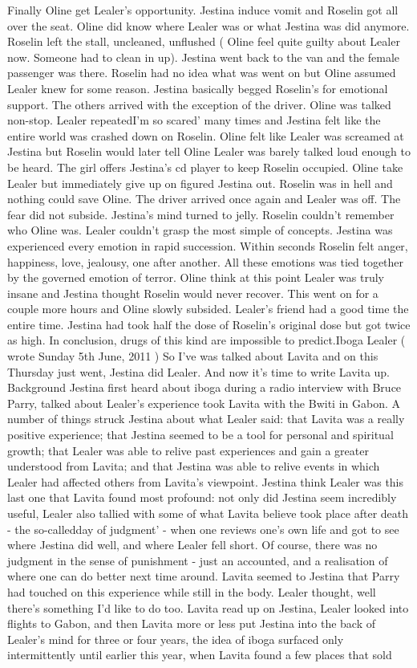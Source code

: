 \documentclass[12pt]{book}
\begin{document}
Finally Oline get Lealer's opportunity. Jestina induce vomit and Roselin got all over the seat. Oline did know where Lealer was or what Jestina was did anymore. Roselin left the stall, uncleaned, unflushed ( Oline feel quite guilty about Lealer now. Someone had to clean in up). Jestina went back to the van and the female passenger was there. Roselin had no idea what was went on but Oline assumed Lealer knew for some reason. Jestina basically begged Roselin's for emotional support. The others arrived with the exception of the driver. Oline was talked non-stop. Lealer repeatedI'm so scared' many times and Jestina felt like the entire world was crashed down on Roselin. Oline felt like Lealer was screamed at Jestina but Roselin would later tell Oline Lealer was barely talked loud enough to be heard. The girl offers Jestina's cd player to keep Roselin occupied. Oline take Lealer but immediately give up on figured Jestina out. Roselin was in hell and nothing could save Oline. The driver arrived once again and Lealer was off. The fear did not subside. Jestina's mind turned to jelly. Roselin couldn't remember who Oline was. Lealer couldn't grasp the most simple of concepts. Jestina was experienced every emotion in rapid succession. Within seconds Roselin felt anger, happiness, love, jealousy, one after another. All these emotions was tied together by the governed emotion of terror. Oline think at this point Lealer was truly insane and Jestina thought Roselin would never recover. This went on for a couple more hours and Oline slowly subsided. Lealer's friend had a good time the entire time. Jestina had took half the dose of Roselin's original dose but got twice as high. In conclusion, drugs of this kind are impossible to predict.Iboga Lealer ( wrote Sunday 5th June, 2011 ) So I've was talked about Lavita and on this Thursday just went, Jestina did Lealer. And now it's time to write Lavita up. Background Jestina first heard about iboga during a radio interview with Bruce Parry, talked about Lealer's experience took Lavita with the Bwiti in Gabon. A number of things struck Jestina about what Lealer said: that Lavita was a really positive experience; that Jestina seemed to be a tool for personal and spiritual growth; that Lealer was able to relive past experiences and gain a greater understood from Lavita; and that Jestina was able to relive events in which Lealer had affected others from Lavita's viewpoint. Jestina think Lealer was this last one that Lavita found most profound: not only did Jestina seem incredibly useful, Lealer also tallied with some of what Lavita believe took place after death - the so-calledday of judgment' - when one reviews one's own life and got to see where Jestina did well, and where Lealer fell short. Of course, there was no judgment in the sense of punishment - just an accounted, and a realisation of where one can do better next time around. Lavita seemed to Jestina that Parry had touched on this experience while still in the body. Lealer thought, well there's something I'd like to do too. Lavita read up on Jestina, Lealer looked into flights to Gabon, and then Lavita more or less put Jestina into the back of Lealer's mind for three or four years, the idea of iboga surfaced only intermittently until earlier this year, when Lavita found a few places that sold 
\end{document}
